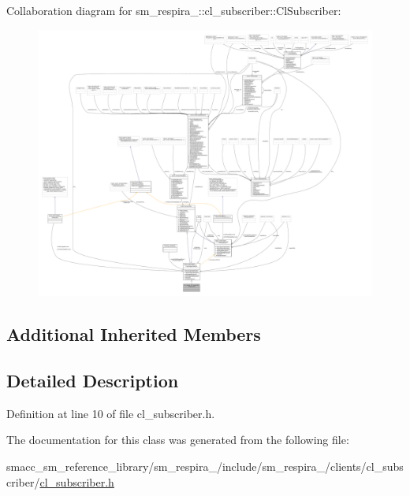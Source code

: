 Collaboration diagram for sm\+\_\+respira\+\_\+:\+:cl\+\_\+subscriber\+:\+:Cl\+Subscriber\+:
\nopagebreak
\begin{figure}[H]
\begin{center}
\leavevmode
\includegraphics[width=350pt]{classsm__respira__1_1_1cl__subscriber_1_1ClSubscriber__coll__graph}
\end{center}
\end{figure}
\subsection*{Additional Inherited Members}


\subsection{Detailed Description}


Definition at line 10 of file cl\+\_\+subscriber.\+h.



The documentation for this class was generated from the following file\+:\begin{DoxyCompactItemize}
\item 
smacc\+\_\+sm\+\_\+reference\+\_\+library/sm\+\_\+respira\+\_/include/sm\+\_\+respira\+\_/clients/cl\+\_\+subscriber/\hyperlink{sm__respira__1_2include_2sm__respira__1_2clients_2cl__subscriber_2cl__subscriber_8h}{cl\+\_\+subscriber.\+h}\end{DoxyCompactItemize}
